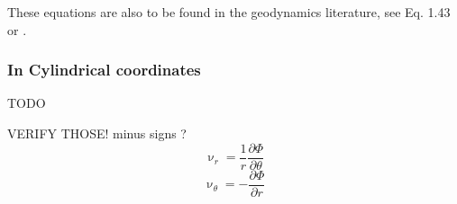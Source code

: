 These equations are also to be found in the geodynamics literature, 
see Eq. 1.43 \cite[eq. 1.43]{tack10} or \cite[p 70-71]{gery10}.





\subsubsection{In Cylindrical coordinates}

TODO

VERIFY THOSE! minus signs ?
\[
\upnu_r=\frac{1}{r}\frac{\partial \Phi}{\partial \theta} 
\]
\[
\upnu_\theta=-\frac{\partial \Phi}{\partial r} 
\]
